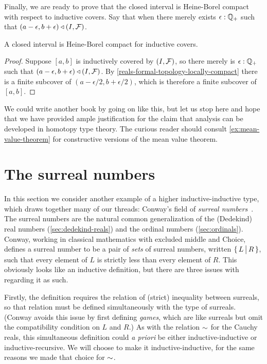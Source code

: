 Finally, we are ready to prove that the closed interval is Heine-Borel compact with
respect to inductive covers. Say that  when there merely exists $\epsilon : \mathbb{Q}_{+}$ such that $(a - \epsilon, b +
\epsilon) \triangleleft {\mathopen{}(I, \mathcal{F})\mathclose{}}$.

\begin{cor} \label{interval-Heine-Borel}
  A closed interval is Heine-Borel compact for inductive covers.
\end{cor}

\begin{proof}
  Suppose $[a, b]$ is inductively covered by ${\mathopen{}(I, \mathcal{F})\mathclose{}}$, so there merely is
  $\epsilon : \mathbb{Q}_{+}$ such that $(a - \epsilon, b + \epsilon) \triangleleft {\mathopen{}(I, \mathcal{F})\mathclose{}}$.
  By \autoref{reals-formal-topology-locally-compact} there is a finite subcover of
  $(a - \epsilon/2, b + \epsilon/2)$, which is therefore a finite subcover of $[a, b]$.
\end{proof}

We could write another book by going on like this, but let us stop here and hope that we
have provided ample justification for the claim that analysis can be developed in homotopy
type theory. The curious reader should consult \autoref{ex:mean-value-theorem} for
constructive versions of the mean value theorem.

\section{The surreal numbers}
\label{sec:surreals}

In this section we consider another example of a higher inductive-in\-duc\-tive type, which draws together many of our threads: Conway's field \NO of \emph{surreal numbers}~\cite{conway:onag}.
The surreal numbers are the natural common generalization of the (Dedekind) real numbers (\autoref{sec:dedekind-reals}) and the ordinal numbers (\autoref{sec:ordinals}).
Conway, working in classical mathematics with excluded middle and Choice, defines a surreal number to be a pair of \emph{sets} of surreal numbers, written $\{\,L\,\big|\,R\,\}$, such that every element of $L$ is strictly less than every element of $R$.
This obviously looks like an inductive definition, but there are three issues with regarding it as such.

Firstly, the definition requires the relation of (strict) inequality between surreals, so that relation must be defined simultaneously with the type \NO of surreals.
(Conway avoids this issue by first defining \emph{games}, which are like surreals but omit the compatibility condition on $L$ and $R$.)
As with the relation $\mathord\sim$ for the Cauchy reals, this simultaneous definition could \emph{a priori} be either inductive-inductive or inductive-recursive.
We will choose to make it inductive-inductive, for the same reasons we made that choice for $\mathord\sim$.

